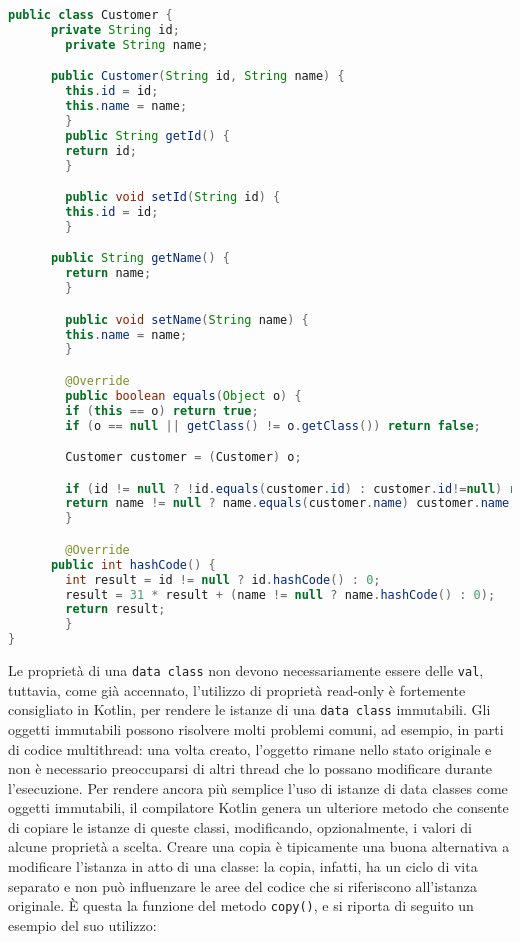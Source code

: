 \begin{lstlisting}[caption={Data Class corrispondente scritta in Java}, captionpos=b, label={lst:exampleDataClassJava}, language=Java]
public class Customer {
   	  private String id;
    	private String name;

      public Customer(String id, String name) {
        this.id = id;
        this.name = name;
    	}
    	public String getId() {
        return id;
    	}

    	public void setId(String id) {
        this.id = id;
    	}

   	  public String getName() {
        return name;
    	}

    	public void setName(String name) {
        this.name = name;
    	}

    	@Override
    	public boolean equals(Object o) {
        if (this == o) return true;
        if (o == null || getClass() != o.getClass()) return false;

        Customer customer = (Customer) o;

        if (id != null ? !id.equals(customer.id) : customer.id!=null) return false;
        return name != null ? name.equals(customer.name) customer.name == null;
    	}

    	@Override
   	  public int hashCode() {
        int result = id != null ? id.hashCode() : 0;
        result = 31 * result + (name != null ? name.hashCode() : 0);
        return result;
    	}
}
\end{lstlisting}

Le proprietà di una \texttt{data class} non devono necessariamente essere delle \texttt{val}, tuttavia, come già accennato, l’utilizzo di proprietà read-only è fortemente consigliato in Kotlin, per rendere le istanze di una \texttt{data class} immutabili. Gli oggetti immutabili possono risolvere molti problemi comuni, ad esempio, in parti di codice multithread: una volta creato, l’oggetto rimane nello stato originale e non è necessario preoccuparsi di altri thread che lo possano modificare durante l’esecuzione.
Per rendere ancora più semplice l'uso di istanze di data classes come oggetti immutabili, il compilatore Kotlin genera un ulteriore metodo che consente di copiare le istanze di queste classi, modificando, opzionalmente, i valori di alcune proprietà a scelta. Creare una copia è tipicamente una buona alternativa a modificare l'istanza in atto di una classe: la copia, infatti, ha un ciclo di vita separato e non può influenzare le aree del codice che si riferiscono all'istanza originale. È questa la funzione del metodo \texttt{copy()}, e si riporta di seguito un esempio del suo utilizzo:\\

